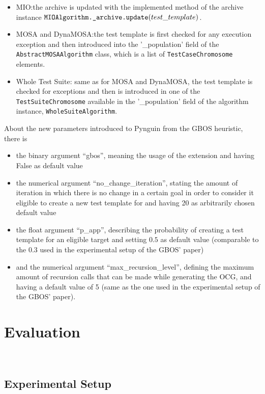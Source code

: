 \documentclass[%
  chapterprefix=false,%
  open=right,%
  twoside=true,%
  paper=a4,%
  logofile={Figures/logo.png},%
  thesistype=master,%
  UKenglish,%
]{se2thesis}
\newcommand{\classname}[1]{\texttt{#1}}
\newcommand{\callable}[2][]{\(\text{\texttt{#2}}(#1)\)}
\begin{document}
\begin{itemize}
  \item MIO:\@ the archive is updated with the implemented method of the archive instance \callable[test\_template]{MIOAlgorithm.\_archive.update}.
  \item MOSA and DynaMOSA:\@ the test template is first checked for any execution exception and then introduced into the '\_population' field of the \classname{AbstractMOSAAlgorithm} class, which is a list of \classname{TestCaseChromosome} elements.
  \item Whole Test Suite: same as for MOSA and DynaMOSA, the test template is checked for exceptions and then is introduced in one of the \classname{TestSuiteChromosome} available in the '\_population' field of the algorithm instance, \classname{WholeSuiteAlgorithm}.
\end{itemize}

About the new parameters introduced to Pynguin from the GBOS heuristic, there is
\begin{itemize}
  \item the binary argument ``gbos'', meaning the usage of the extension and having False as default value
  \item the numerical argument ``no\_change\_iteration'', stating the amount of iteration in which there is no change in a certain goal in order to consider it eligible to create a new test template for and having 20 as arbitrarily chosen default value
  \item the float argument ``p\_app'', describing the probability of creating a test template for an eligible target and setting \(0.5\) as default value (comparable to the \(0.3\) used in the experimental setup of the GBOS' paper)
  \item and the numerical argument ``max\_recursion\_level'', defining the maximum amount of recursion calls that can be made while generating the OCG, and having a default value of 5 (same as the one used in the experimental setup of the GBOS' paper).
\end{itemize}

\chapter{Evaluation}~\label{chap:evaluation}

\section{Experimental Setup}\label{sec:experimental_setup}
\end{document}
